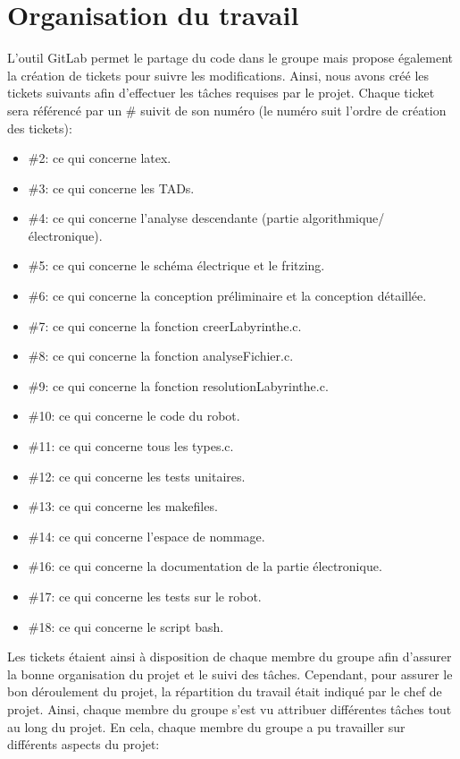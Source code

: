 \section{Organisation du travail}

L'outil GitLab permet le partage du code dans le groupe mais propose également la création de tickets pour suivre les modifications. Ainsi, nous avons créé les tickets suivants afin d'effectuer les tâches requises par le projet. Chaque ticket sera référencé par un \# suivit de son numéro (le numéro suit l'ordre de création des tickets): 
\vspace{2mm}

\begin{itemize}
    \item \#2: ce qui concerne latex.
    \item \#3: ce qui concerne les TADs.
    \item \#4: ce qui concerne l'analyse descendante (partie algorithmique/\\ électronique).
    \item \#5: ce qui concerne le schéma électrique et le fritzing.
    \item \#6: ce qui concerne la conception préliminaire et la conception détaillée.
    \item \#7: ce qui concerne la fonction creerLabyrinthe.c.
    \item \#8: ce qui concerne la fonction analyseFichier.c.
    \item \#9: ce qui concerne la fonction resolutionLabyrinthe.c.
    \item \#10: ce qui concerne le code du robot.
    \item \#11: ce qui concerne tous les types.c.
    \item \#12: ce qui concerne les tests unitaires.
    \item \#13: ce qui concerne les makefiles.
    \item \#14: ce qui concerne l'espace de nommage.
    \item \#16: ce qui concerne la documentation de la partie électronique.
    \item \#17: ce qui concerne les tests sur le robot.
    \item \#18: ce qui concerne le script bash.
\end{itemize}
\vspace{5mm}

Les tickets étaient ainsi à disposition de chaque membre du groupe afin d'assurer la bonne organisation du projet et le suivi des tâches. Cependant, pour assurer le bon déroulement du projet, la répartition du travail était indiqué par le chef de projet. Ainsi, chaque membre du groupe s'est vu attribuer différentes tâches tout au long du projet. En cela, chaque membre du groupe a pu travailler sur différents aspects du projet:

